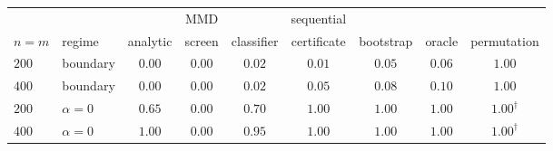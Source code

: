\begin{tabular}{llccccccc}
\toprule
& & & MMD & & sequential & & & \\
$n=m$ & regime & analytic & screen & classifier & certificate & bootstrap & oracle & permutation \\
\midrule
$200$ & boundary & $0.00$ & $0.00$ & $0.02$ & $0.01$ & $0.05$ & $0.06$ & $1.00$ \\
$400$ & boundary & $0.00$ & $0.00$ & $0.02$ & $0.05$ & $0.08$ & $0.10$ & $1.00$ \\
\addlinespace
$200$ & $\alpha=0$ & $0.65$ & $0.00$ & $0.70$ & $1.00$ & $1.00$ & $1.00$ & $1.00^{\dagger}$ \\
$400$ & $\alpha=0$ & $1.00$ & $0.00$ & $0.95$ & $1.00$ & $1.00$ & $1.00$ & $1.00^{\dagger}$ \\
\bottomrule
\end{tabular}
